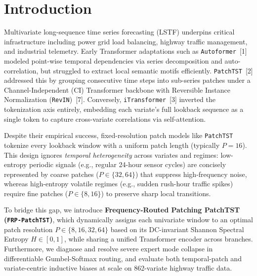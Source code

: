 \documentclass[11pt, letterpaper]{article}
\begin{document}
\section{Introduction}

Multivariate long-sequence time series forecasting (LSTF) underpins critical infrastructure including power grid load balancing, highway traffic management, and industrial telemetry. Early Transformer adaptations such as \texttt{Autoformer}~[1] modeled point-wise temporal dependencies via series decomposition and auto-correlation, but struggled to extract local semantic motifs efficiently. \texttt{PatchTST}~[2] addressed this by grouping consecutive time steps into sub-series patches under a Channel-Independent (CI) Transformer backbone with Reversible Instance Normalization (\texttt{RevIN})~[7]. Conversely, \texttt{iTransformer}~[3] inverted the tokenization axis entirely, embedding each variate's full lookback sequence as a single token to capture cross-variate correlations via self-attention.

Despite their empirical success, fixed-resolution patch models like \texttt{PatchTST} tokenize every lookback window with a uniform patch length (typically $P=16$). This design ignores \emph{temporal heterogeneity} across variates and regimes: low-entropy periodic signals (e.g., regular 24-hour sensor cycles) are concisely represented by coarse patches ($P \in \{32, 64\}$) that suppress high-frequency noise, whereas high-entropy volatile regimes (e.g., sudden rush-hour traffic spikes) require fine patches ($P \in \{8, 16\}$) to preserve sharp local transitions.

To bridge this gap, we introduce \textbf{Frequency-Routed Patching PatchTST (\texttt{FRP-PatchTST})}, which dynamically assigns each univariate window to an optimal patch resolution $P \in \{8, 16, 32, 64\}$ based on its DC-invariant Shannon Spectral Entropy $H \in [0, 1]$, while sharing a unified Transformer encoder across branches. Furthermore, we diagnose and resolve severe expert mode collapse in differentiable Gumbel-Softmax routing, and evaluate both temporal-patch and variate-centric inductive biases at scale on 862-variate highway traffic data.
\end{document}
